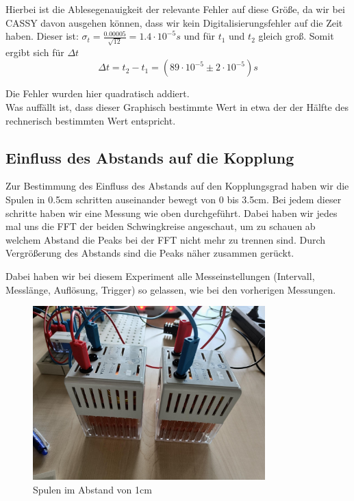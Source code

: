 \documentclass[twoside]{protokoll}
\begin{document}
Hierbei ist die Ablesegenauigkeit der relevante Fehler auf diese Größe, da wir bei CASSY davon ausgehen können, dass wir kein Digitalisierungsfehler auf die Zeit haben. 
Dieser ist: $\sigma_t = \frac{0.00005}{\sqrt{12}} = 1.4\cdot 10^{-5}s$  und für $t_1$ und $t_2$ gleich groß.
Somit ergibt sich für $\Delta t$
\begin{equation}
\Delta t = t_2 - t_1 =  (89\cdot 10^{-5} \pm 2\cdot10^{-5})s
\end{equation}

Die Fehler wurden hier quadratisch addiert. \\
Was auffällt ist, dass dieser Graphisch bestimmte Wert in etwa der der Hälfte des rechnerisch bestimmten Wert entspricht. 

\subsection{Einfluss des Abstands auf die Kopplung}
Zur Bestimmung des Einfluss des Abstands auf den Kopplungsgrad haben wir die Spulen in 0.5cm schritten auseinander bewegt von 0 bis 3.5cm. 
Bei jedem dieser schritte haben wir eine Messung wie oben durchgeführt. Dabei haben wir jedes mal uns die FFT der beiden Schwingkreise angeschaut, um zu schauen ab welchem Abstand die Peaks bei der FFT nicht mehr zu trennen sind. Durch Vergrößerung des Abstands sind die Peaks näher zusammen gerückt.

Dabei haben wir bei diesem Experiment alle Messeinstellungen (Intervall, Messlänge, Auflösung, Trigger) so gelassen, wie bei den vorherigen Messungen.

\begin{figure}[H]
    \centering
    \includegraphics[width=0.8\textwidth]{bilder/Abstand_Spulen.pdf}
    \caption{Spulen im Abstand von 1cm}
\end{figure}
\end{document}
